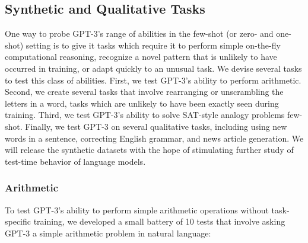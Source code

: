     \subsection{Synthetic and Qualitative Tasks}
    \label{section:Synthetic_and_Qualitative_Tasks}

One way to probe GPT-3’s range of abilities in the few-shot (or zero- and one-shot) setting is to give it tasks which require it to perform simple on-the-fly computational reasoning, recognize a novel pattern that is unlikely to have occurred in training, or adapt quickly to an unusual task.  We devise several tasks to test this class of abilities.  First, we test GPT-3’s ability to perform arithmetic.  Second, we create several tasks that involve rearranging or unscrambling the letters in a word, tasks which are unlikely to have been exactly seen during training.  Third, we test GPT-3’s ability to solve SAT-style analogy problems few-shot.  Finally, we test GPT-3 on several qualitative tasks, including using new words in a sentence, correcting English grammar, and news article generation.  We will release the synthetic datasets with the hope of stimulating further study of test-time behavior of language models.

        \subsubsection{Arithmetic}
        \label{section:Arithmetic}

To test GPT-3's ability to perform simple arithmetic operations without task-specific training, we developed a small battery of 10 tests that involve asking GPT-3 a simple arithmetic problem in natural language:

